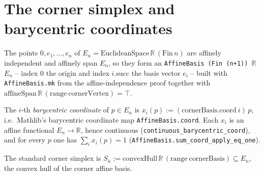 \section{The corner simplex and barycentric coordinates}


\begin{definition}
    \label{def:corner-basis}
    The points $0, e_1, \dots, e_n$ of $E_n = \mathrm{EuclideanSpace}\,\mathbb R\,
    (\mathrm{Fin}\,n)$ are affinely independent and affinely span $E_n$, so they
    form an \texttt{AffineBasis (Fin (n+1)) $\mathbb R$ $E_n$} -- index $0$ the
    origin and index $i.\mathrm{succ}$ the basis vector $e_i$ -- built with
    \texttt{AffineBasis.mk} from the affine-independence proof together with
    $\mathrm{affineSpan}\,\mathbb R\,(\mathrm{range}\ \mathrm{cornerVertex}) = \top$.
\end{definition}

\begin{definition}
    \label{def:bary-coord}
    The $i$-th \emph{barycentric coordinate} of $p \in E_n$ is
    $x_i(p) := (\mathrm{cornerBasis}.\mathrm{coord}\ i)\,p$, i.e.\ Mathlib's
    barycentric coordinate map \texttt{AffineBasis.coord}. Each $x_i$ is an affine
    functional $E_n \to \mathbb R$, hence continuous
    (\texttt{continuous\_barycentric\_coord}), and for every $p$ one has
    $\sum_i x_i(p) = 1$ (\texttt{AffineBasis.sum\_coord\_apply\_eq\_one}).
\end{definition}

\begin{definition}
    \label{def:corner-simplex}
    The standard corner simplex is
    $S_n := \mathrm{convexHull}\,\mathbb R\,(\mathrm{range}\ \mathrm{cornerBasis})
    \subseteq E_n$, the convex hull of the corner affine basis.
\end{definition}

